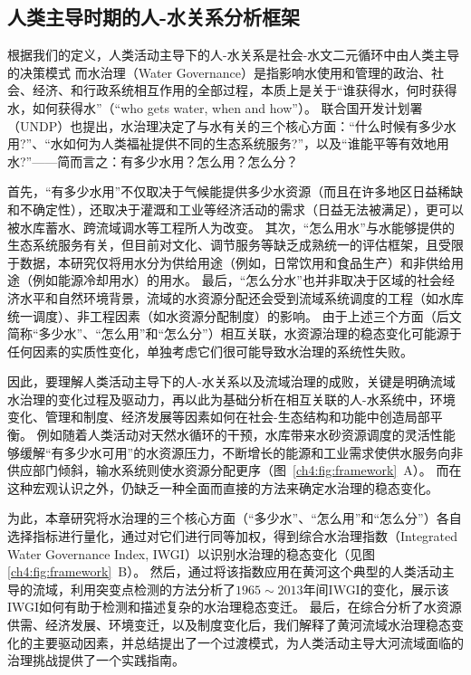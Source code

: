 
\subsection{人类主导时期的人-水关系分析框架}

根据我们的定义，人类活动主导下的人-水关系是社会-水文二元循环中由人类主导的决策模式
而水治理（Water Governance）是指影响水使用和管理的政治、社会、经济、和行政系统相互作用的全部过程，本质上是关于“谁获得水，何时获得水，如何获得水”（``who gets water, when and how''）。
联合国开发计划署（UNDP）也提出\cite{undpwatergovernancefacility2016}，水治理决定了与水有关的三个核心方面：“什么时候有多少水用?”、“水如何为人类福祉提供不同的生态系统服务?”，以及“谁能平等有效地用水?”——简而言之：有多少水用？怎么用？怎么分？

首先，“有多少水用”不仅取决于气候能提供多少水资源（而且在许多地区日益稀缺和不确定性），还取决于灌溉和工业等经济活动的需求（日益无法被满足），更可以被水库蓄水、跨流域调水等工程所人为改变\cite{qin2019,wada2014,huang2021}。
其次，“怎么用水”与水能够提供的生态系统服务有关，但目前对文化、调节服务等缺乏成熟统一的评估框架，且受限于数据，本研究仅将用水分为供给用途（例如，日常饮用和食品生产）和非供给用途（例如能源冷却用水）的用水\cite{liu2017,florke2018,jaeger2019}。
最后，“怎么分水”也并非取决于区域的社会经济水平和自然环境背景，流域的水资源分配还会受到流域系统调度的工程（如水库统一调度）、非工程因素（如水资源分配制度）的影响\cite{schmandt2021,speed2013}。
由于上述三个方面（后文简称“多少水”、“怎么用”和“怎么分”）相互关联，水资源治理的稳态变化可能源于任何因素的实质性变化，单独考虑它们很可能导致水治理的系统性失败。

因此，要理解人类活动主导下的人-水关系以及流域治理的成败，关键是明确流域水治理的变化过程及驱动力，再以此为基础分析在相互关联的人-水系统中，环境变化、管理和制度、经济发展等因素如何在社会-生态结构和功能中创造局部平衡\cite{falkenmark2021,bressers2013,loch2020}。
例如随着人类活动对天然水循环的干预，水库带来水砂资源调度的灵活性能够缓解“有多少水可用”的水资源压力，不断增长的能源和工业需求使供水服务向非供应部门倾斜，输水系统则使水资源分配更序（图~\ref{ch4:fig:framework}~A）。
而在这种宏观认识之外，仍缺乏一种全面而直接的方法来确定水治理的稳态变化。

为此，本章研究将水治理的三个核心方面（“多少水”、“怎么用”和“怎么分”）各自选择指标进行量化，通过对它们进行同等加权，得到综合水治理指数（Integrated Water Governance Index, IWGI）以识别水治理的稳态变化（见图\ref{ch4:fig:framework}~B）。
然后，通过将该指数应用在黄河这个典型的人类活动主导的流域，利用突变点检测的方法分析了$1965\sim2013$年间IWGI的变化，展示该IWGI如何有助于检测和描述复杂的水治理稳态变迁。
最后，在综合分析了水资源供需、经济发展、环境变迁，以及制度变化后，我们解释了黄河流域水治理稳态变化的主要驱动因素，并总结提出了一个过渡模式，为人类活动主导大河流域面临的治理挑战提供了一个实践指南。

